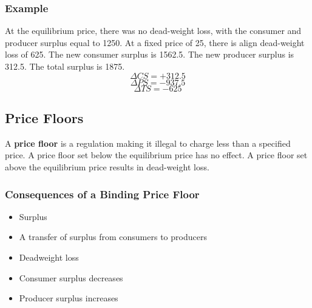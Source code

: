\documentclass{article}
\begin{document}
\subsubsection{Example}
\begin{center}
\end{center}
At the equilibrium price, there was no dead-weight loss, with the consumer
and producer surplus equal to 1250. At a fixed price of 25, there is align
dead-weight loss of 625. The new consumer surplus is 1562.5. The new
producer surplus is 312.5. The total surplus is 1875.
\[ \Delta CS = +312.5 \]
\[ \Delta PS = -937.5 \]
\[ \Delta TS = -625 \]

\subsection{Price Floors}
A \textbf{price floor} is a regulation making it illegal to charge less than a
specified price. A price floor set below the equilibrium price has no effect.
A price floor set above the equilibrium price results in dead-weight loss.

\subsubsection{Consequences of a Binding Price Floor}
\begin{itemize}
  \item Surplus
  \item A transfer of surplus from consumers to producers
  \item Deadweight loss
  \item Consumer surplus decreases
  \item Producer surplus increases
\end{itemize}
\end{document}
